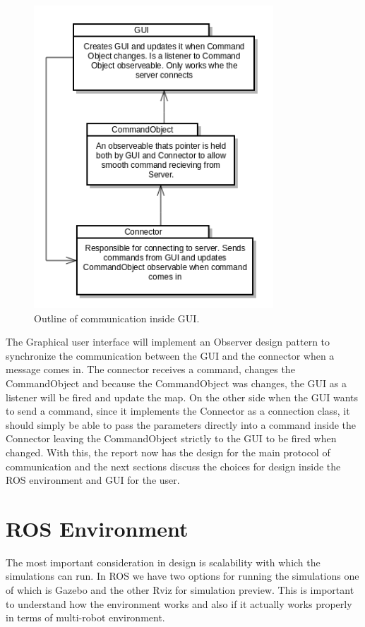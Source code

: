 \documentclass{report}
\begin{document}
        \begin{figure}[!ht]  
            \centering
              \includegraphics[width=0.8\textwidth]{figures/GUICommunication.png}
              \caption{Outline of communication inside GUI.}
          \end{figure}

        The Graphical user interface will implement an Observer design pattern to synchronize the communication between the GUI and the connector when a message comes in. The connector receives a command, changes the CommandObject and because the CommandObject was changes, the GUI as a listener will be fired and update the map. On the other side when the GUI wants to send a command, since it implements the Connector as a connection class, it should simply be able to pass the parameters directly into a command inside the Connector leaving the CommandObject strictly to the GUI to be fired when changed. With this, the report now has the design for the main protocol of communication and the next sections discuss the choices for design inside the ROS environment and GUI for the user.

    \section{ROS Environment}
      The most important consideration in design is scalability with which the simulations can run. In ROS we have two options for running the simulations one of which is Gazebo and the other Rviz for simulation preview. This is important to understand how the environment works and also if it actually works properly in terms of multi-robot environment.
\end{document}
